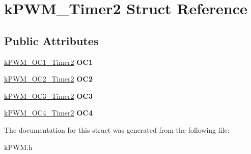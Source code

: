 \hypertarget{structkPWM__Timer2}{}\section{k\+P\+W\+M\+\_\+\+Timer2 Struct Reference}
\label{structkPWM__Timer2}
\subsection*{Public Attributes}
\begin{DoxyCompactItemize}
\item 
\hyperlink{structkPWM__OC1__Timer2}{k\+P\+W\+M\+\_\+\+O\+C1\+\_\+\+Timer2} {\bfseries O\+C1}\hypertarget{structkPWM__Timer2_a020578e294b26b0704a0e2d452158db1}{}\label{structkPWM__Timer2_a020578e294b26b0704a0e2d452158db1}

\item 
\hyperlink{structkPWM__OC2__Timer2}{k\+P\+W\+M\+\_\+\+O\+C2\+\_\+\+Timer2} {\bfseries O\+C2}\hypertarget{structkPWM__Timer2_adba182e31dc7dd507a6402c03bdfc75a}{}\label{structkPWM__Timer2_adba182e31dc7dd507a6402c03bdfc75a}

\item 
\hyperlink{structkPWM__OC3__Timer2}{k\+P\+W\+M\+\_\+\+O\+C3\+\_\+\+Timer2} {\bfseries O\+C3}\hypertarget{structkPWM__Timer2_a7ac126db036b8752e89da4d8731f24cf}{}\label{structkPWM__Timer2_a7ac126db036b8752e89da4d8731f24cf}

\item 
\hyperlink{structkPWM__OC4__Timer2}{k\+P\+W\+M\+\_\+\+O\+C4\+\_\+\+Timer2} {\bfseries O\+C4}\hypertarget{structkPWM__Timer2_a71d50320eb03eeddcdb459cc8a4c28f0}{}\label{structkPWM__Timer2_a71d50320eb03eeddcdb459cc8a4c28f0}

\end{DoxyCompactItemize}


The documentation for this struct was generated from the following file\+:\begin{DoxyCompactItemize}
\item 
k\+P\+W\+M.\+h\end{DoxyCompactItemize}
